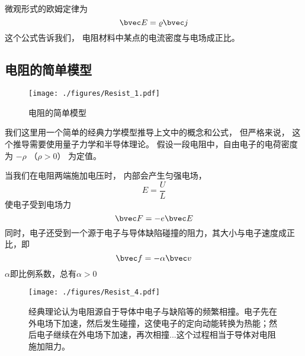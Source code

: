 微观形式的欧姆定律为
\begin{equation}
\bvec E = \varrho\bvec j
\end{equation}
这个公式告诉我们， 电阻材料中某点的电流密度与电场成正比。

\subsection{电阻的简单模型}
\begin{figure}[ht]
\centering
\texttt{[image: ./figures/Resist\_1.pdf]}
\caption{电阻的简单模型} \label{Resist_fig1}
\end{figure}

我们这里用一个简单的经典力学模型推导上文中的概念和公式， 但严格来说， 这个推导需要使用量子力学和半导体理论。 假设一段电阻中，自由电子的电荷密度为 $-\rho$ （$\rho > 0$） 为定值。

当我们在电阻两端施加电压时， 内部会产生匀强电场，
\begin{equation}\label{Resist_eq6}
E = \frac UL
\end{equation}
使电子受到电场力
\begin{equation}
\bvec F = -e\bvec E
\end{equation}
同时，电子还受到一个源于电子与导体缺陷碰撞的阻力，其大小与电子速度成正比，即
\begin{equation}
\bvec f = -\alpha \bvec v
\end{equation}
$\alpha$即比例系数，总有$\alpha>0$

\begin{figure}[ht]
\centering
\texttt{[image: ./figures/Resist\_4.pdf]}
\caption{经典理论认为电阻源自于导体中电子与缺陷等的频繁相撞。电子先在外电场下加速，然后发生碰撞，这使电子的定向动能转换为热能；然后电子继续在外电场下加速，再次相撞...这个过程相当于导体对电阻施加阻力。} \label{Resist_fig4}
\end{figure}

